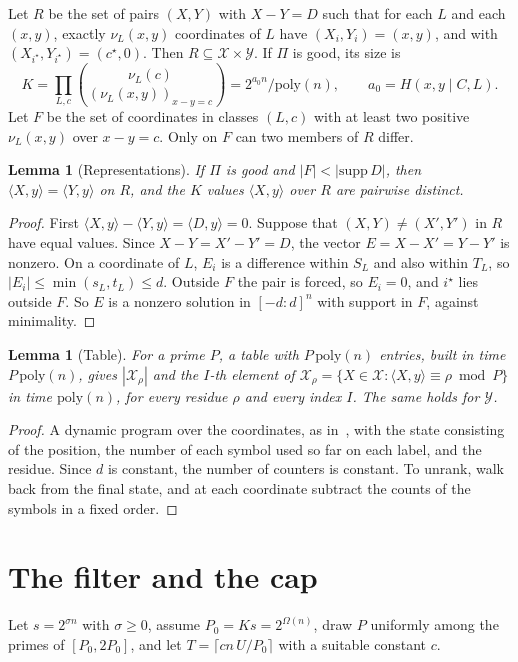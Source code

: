 \documentclass[11pt]{article}
\newtheorem{lemma}[theorem]{Lemma}
\theoremstyle{remark}
\newcommand{\Xs}{\mathcal X}
\newcommand{\Ys}{\mathcal Y}
\newcommand{\ip}[2]{\langle #1,#2\rangle}
\newcommand{\cc}[1]{[-#1:#1]}
\begin{document}
Let $R$ be the set of pairs $(X,Y)$ with $X-Y=D$ such that for each $L$ and each $(x,y)$, exactly $\nu_L(x,y)$ coordinates of $L$ have $(X_i,Y_i)=(x,y)$, and with $(X_{i^\star},Y_{i^\star})=(c^\star,0)$. Then $R\subseteq\Xs\times\Ys$. If $\Pi$ is good, its size is
\[
K=\prod_{L,c}\binom{\nu_L(c)}{(\nu_L(x,y))_{x-y=c}}=2^{a_0n}/\mathrm{poly}(n),\qquad a_0=H(x,y\mid C,L).
\]
Let $F$ be the set of coordinates in classes $(L,c)$ with at least two positive $\nu_L(x,y)$ over $x-y=c$. Only on $F$ can two members of $R$ differ.

\begin{lemma}[Representations]\label{lem:reps}
If $\Pi$ is good and $|F|<|\mathrm{supp}\,D|$, then $\ip Xy=\ip Yy$ on $R$, and the $K$ values $\ip Xy$ over $R$ are pairwise distinct.
\end{lemma}
\begin{proof}
First $\ip Xy-\ip Yy=\ip Dy=0$. Suppose that $(X,Y)\ne(X',Y')$ in $R$ have equal values. Since $X-Y=X'-Y'=D$, the vector $E=X-X'=Y-Y'$ is nonzero. On a coordinate of $L$, $E_i$ is a difference within $S_L$ and also within $T_L$, so $|E_i|\le\min(s_L,t_L)\le d$. Outside $F$ the pair is forced, so $E_i=0$, and $i^\star$ lies outside $F$. So $E$ is a nonzero solution in $\cc d^n$ with support in $F$, against minimality.
\end{proof}

\begin{lemma}[Table]\label{lem:table}
For a prime $P$, a table with $P\,\mathrm{poly}(n)$ entries, built in time $P\,\mathrm{poly}(n)$, gives $|\Xs_\rho|$ and the $I$-th element of $\Xs_\rho=\{X\in\Xs:\ip Xy\equiv\rho\bmod P\}$ in time $\mathrm{poly}(n)$, for every residue $\rho$ and every index $I$. The same holds for $\Ys$.
\end{lemma}
\begin{proof}
A dynamic program over the coordinates, as in~\cite[Theorem 3.5]{AHJKS22}, with the state consisting of the position, the number of each symbol used so far on each label, and the residue. Since $d$ is constant, the number of counters is constant. To unrank, walk back from the final state, and at each coordinate subtract the counts of the symbols in a fixed order.
\end{proof}

\section{The filter and the cap}\label{sec:filter}

Let $s=2^{\sigma n}$ with $\sigma\ge0$, assume $P_0=Ks=2^{\Omega(n)}$, draw $P$ uniformly among the primes of $[P_0,2P_0]$, and let $T=\lceil cn\,U/P_0\rceil$ with a suitable constant $c$.
\end{document}
